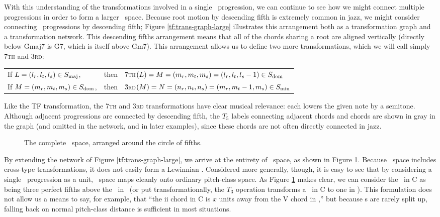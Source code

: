 With this understanding of the transformations involved in a single \tfo\
progression, we can continue to see how we might connect multiple progressions
in order to form a larger \tf\ space. Because root motion by descending
fifth is extremely common in jazz, we might consider connecting \tfo\
progressions by descending fifth; Figure \ref{tf:trans-graph-large}
illustrates this arrangement both as a transformation graph and a
transformation network.  This descending fifths arrangement means that all of
the chords sharing a root are aligned vertically (directly below \h{Gmaj7} is
\h{G7}, which is itself above \h{Gm7}). This arrangement allows us to define
two more transformations, which we will call simply \textsc{7th} and
\textsc{3rd}: \\
%
\vspace{0.5\baselineskip}
\begin{tabular}{lcl}
  If $L = (l_r, l_t, l_s) \in S_{\mathrm{maj}}$, & then &\h{7}\textsc{th}$(L) = M=(m_r, m_t,
  m_s)=(l_r, l_t, l_s-1) \in S_{\mathrm{dom}}$ \\
%
  If $M = (m_r, m_t, m_s) \in S_{\mathrm{dom}}$, & then &\h{3}\textsc{rd}$(M) = N=(n_r, n_t,
  n_s)=(m_r, m_t-1, m_s) \in S_{\mathrm{min}}$
\end{tabular}
\vspace{0em}

\noindent Like the TF transformation, the \textsc{7th} and \textsc{3rd}
transformations have clear musical relevance: each lowers the given note by a
semitone. Although adjacent progressions are connected by descending fifth,
the $T_5$ labels connecting adjacent \ii chords and \I chords
are shown in gray in the graph (and omitted in the network, and in later
examples), since these chords are not often directly connected in jazz.

\begin{figure}[thb]
  \caption{The complete \tf\ space, arranged around the circle of fifths.}
  \label{tf:tf-circle-fifths}
\end{figure}

By extending the network of Figure \ref{tf:trans-graph-large}, we arrive at
the entirety of \tf\ space, as shown in Figure \ref{tf:tf-circle-fifths}.
Because \tf\ space includes cross-type transformations, it does not easily
form a Lewinnian \gis.\fn{tf-8} Considered more generally, though, it is easy
to see that by considering a single \tfo\ progression as a unit, \tf\ space
maps cleanly onto ordinary pitch-class space. As Figure
\ref{tf:tf-circle-fifths} makes clear, we can consider the \tfo\ in C as
being three perfect fifths above the \tfo\ in \Eflat\ (or put
transformationally, the $T_3$ operation transforms a \tfo\ in C to one in
\Eflat). This formulation does not allow us a means to say, for example, that
“the ii chord in C is $x$ units away from the V chord in \Eflat,” but because
\tfo{}s are rarely split up, falling back on normal pitch-class distance is
sufficient in most situations.\fn{tf-9}

